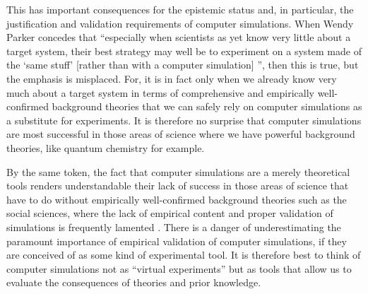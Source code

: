 \documentclass[onecollarge]{STJour}
\numberwithin{equation}{section}
\begin{document}
This has important consequences for the epistemic status and, in particular, the justification and validation requirements of computer simulations. When Wendy Parker concedes that ``especially when scientists as yet know very little about a target system, their best strategy may well be to experiment on a system made of the `same stuff' [rather than with a computer simulation] ''\citep[p. 494]{parker:2009}, then this is true, but the emphasis is misplaced. For, it is in fact only when we already know very much about a target system in terms of comprehensive and empirically well-confirmed background theories that we can safely rely on computer simulations as a substitute for experiments. It is therefore no surprise that computer simulations are most successful in those areas of science where we have powerful background theories, like quantum chemistry for example. 

By the same token, the fact that computer simulations are a merely theoretical tools renders understandable their lack of success in those areas of science that have to do without empirically well-confirmed background theories such as the social sciences, where the lack of empirical content and proper validation of simulations is frequently lamented \citep{heath-et-al:2009}. There is a danger of underestimating the paramount importance of empirical validation of computer simulations, if they are conceived of as some kind of experimental tool. It is therefore best to think of computer simulations not as ``virtual experiments'' but as tools that allow us to evaluate the consequences of theories and prior knowledge.


\newpage


\end{document}
